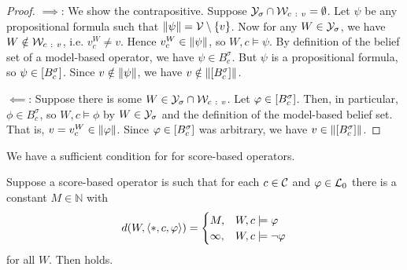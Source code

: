 \begin{proof}
    $\implies$: We show the contrapositive. Suppose $\mathcal{Y}_\sigma \cap \mathcal{W}_{c\
    :\ v} = \emptyset$. Let $\psi$ be any propositional formula such that
    $\|{\psi}\| = \mathcal{V} \setminus \{v\}$. Now for any $W \in \mathcal{Y}_\sigma$,
    we have $W \notin \mathcal{W}_{c\ :\  v}$, i.e. $v^W_c \ne v$. Hence $v^W_c \in
    \|{\psi}\|$, so $W, c \models \psi$. By definition of the belief set
    of a model-based operator, we have $\psi \in B^\sigma_c$. But $\psi$ is a
    propositional formula, so $\psi \in \left[{B^\sigma_c}\right]$. Since $v \notin
    \|{\psi}\|$, we have $v \notin \|{\left[{B^\sigma_c}\right]}\|$.

    $\impliedby$: Suppose there is some $W \in \mathcal{Y}_\sigma \cap \mathcal{W}_{c\ :\ v}$.
    Let $\varphi \in \left[{B^\sigma_c}\right]$. Then, in particular, $\phi \in
    B^\sigma_c$, so $W, c \models \phi$ by $W \in \mathcal{Y}_\sigma$ and the definition
    of the model-based belief set. That is, $v = v^W_c \in \|{\varphi}\|$.
    Since $\varphi \in \left[{B^\sigma_c}\right]$ was arbitrary, we have $v \in
    \|{\left[{B^\sigma_c}\right]}\|$.
\end{proof}

We have a sufficient condition for \agm{} for score-based operators.

\begin{lemma}
    \label{kr_lemma_score_based_agm_sufficient_conditions}
    Suppose a score-based operator is such that for each $c \in \mathcal{C}$ and $\varphi
    \in \mathcal{L}{}_0$ there is a constant $M \in \mathbb{N}$ with
    \[
        d(W, \langle {\ast, c,  \varphi} \rangle)
        = \begin{cases}
            M,& W, c \models \varphi  \\
            \infty,& W, c \models \neg \varphi
        \end{cases}
    \]
    for all $W$. Then \agm{} holds.
\end{lemma}

